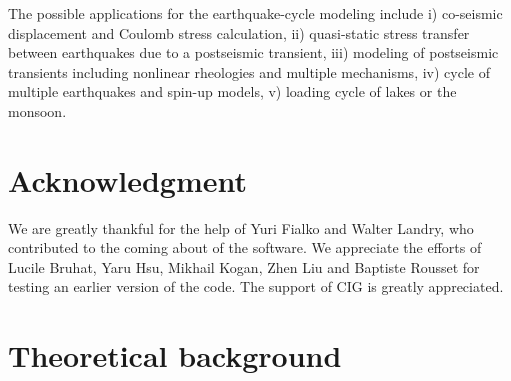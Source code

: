 \documentclass[10pt]{article}
\begin{document}
The possible applications for the earthquake-cycle modeling include i) co-seismic displacement and Coulomb stress calculation, ii) quasi-static stress transfer between earthquakes due to a postseismic transient, iii) modeling of postseismic transients including nonlinear rheologies and multiple mechanisms, iv) cycle of multiple earthquakes and spin-up models, v) loading cycle of lakes or the monsoon.

\section{Acknowledgment}
We are greatly thankful for the help of Yuri Fialko and Walter Landry, who contributed to the coming about of the software. We appreciate the efforts of Lucile Bruhat, Yaru Hsu, Mikhail Kogan, Zhen Liu and Baptiste Rousset for testing an earlier version of the code. The support of CIG is greatly appreciated.


\vspace{2.5cm}
\let\thefootnote\relax{}


\pagebreak

\tableofcontents

\pagebreak

\section{Theoretical background}
\end{document}
